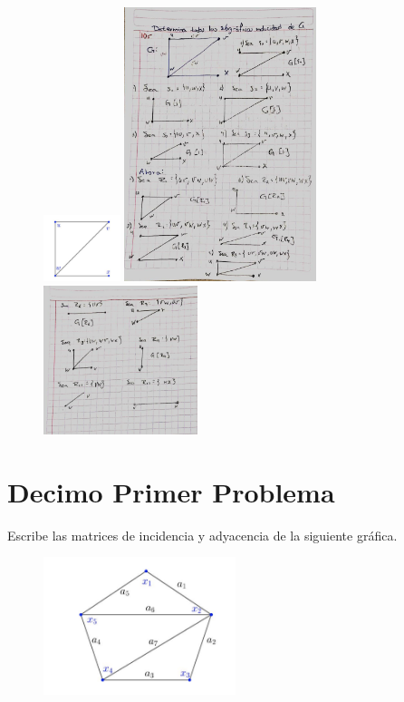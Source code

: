 \documentclass[journal,12pt,onecolumn]{IEEEtran}                %
\theoremstyle{break}                                            %
\begin{document}
        \begin{figure}[h]
            \includegraphics[width=0.2\textwidth]{101}
            \includegraphics[width=0.5\textwidth]{102}
            \includegraphics[width=0.4\textwidth]{103}
        \end{figure}

    \clearpage
    \section*{Decimo Primer Problema}

        Escribe las matrices de incidencia y adyacencia de la siguiente gráfica.
        \begin{figure}[h]
            \includegraphics[width=0.5\textwidth]{11}
        \end{figure}
\end{document}
